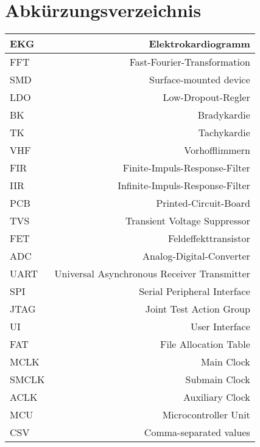 
\section{Abkürzungsverzeichnis} 

\begin{tabular}[]{l|r}
EKG & Elektrokardiogramm 
\\
\hline
FFT & Fast-Fourier-Transformation 
\\
\hline
SMD & Surface-mounted device 
\\
\hline
LDO & Low-Dropout-Regler 
\\
\hline
BK & Bradykardie 
\\
\hline
TK & Tachykardie
\\
\hline
VHF & Vorhofflimmern
\\
\hline
FIR & Finite-Impuls-Response-Filter
\\
\hline
IIR & Infinite-Impuls-Response-Filter
\\
\hline
PCB & Printed-Circuit-Board
\\
\hline
TVS & Transient Voltage Suppressor
\\
\hline
FET & Feldeffekttransistor
\\
\hline
ADC & Analog-Digital-Converter
\\
\hline
UART & Universal Asynchronous Receiver Transmitter
\\
\hline
SPI & Serial Peripheral Interface
\\
\hline
JTAG & Joint Test Action Group
\\
\hline
UI & User Interface
\\
\hline
FAT & File Allocation Table
\\
\hline
MCLK & Main Clock
\\
\hline
SMCLK & Submain Clock
\\
\hline
ACLK & Auxiliary Clock
\\
\hline
MCU & Microcontroller Unit
\\
\hline
CSV & Comma-separated values

\end{tabular}
